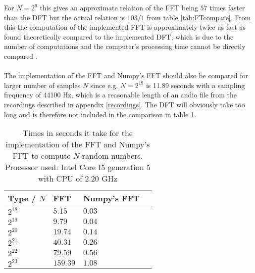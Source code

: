  
For $N=2^9$ this gives an approximate relation of the FFT being $57$ times faster than the DFT but the actual relation is $103/1$ from table \ref{tab:FTcompare}. From this the computation of the implemented FFT is approximately twice as fast as found theoretically compared to the implemented DFT, which is due to the number of computations and the computer's processing time cannot be directly compared . \\
\\
The implementation of the FFT and Numpy's FFT should also be compared for larger number of samples $N$ since e.g. $N = 2^{19}$ is 11.89 seconds with a sampling frequency of 44100 Hz, which is a reasonable length of an audio file from the recordings described in appendix \ref{recordings}. The DFT will obviously take too long and is therefore not included in the comparison in table \ref{tab:FT2compare}.

\begin{table}[H]
\centering
\begin{tabular}{|l|l|l|l|}
\hline
Type / $N$ & FFT	   & Numpy's FFT \\ \hline
$2^{18}$   & $5.15$    & $0.03$ \\ \hline
$2^{19}$   & $9.79$    & $0.04$ \\ \hline
$2^{20}$   & $19.74$   & $0.14$ \\ \hline
$2^{21}$   & $40.31$   & $0.26$ \\ \hline
$2^{22}$   & $79.59$   & $0.56$ \\ \hline
$2^{23}$   & $159.39$  & $1.08$ \\ \hline
\end{tabular}
\caption{Times in seconds it take for the implementation of the FFT and Numpy's FFT to compute $N$ random numbers. Processor used: Intel Core I5 generation 5 with CPU of 2.20 GHz}
\label{tab:FT2compare}
\end{table}

